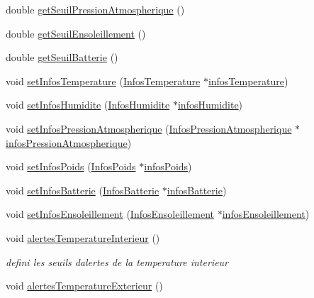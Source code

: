 \begin{DoxyCompactItemize}
\item 
double \hyperlink{class_alertes_a502fa36037246fb6eaad1db859bc1971}{get\+Seuil\+Pression\+Atmospherique} ()
\item 
double \hyperlink{class_alertes_a54900058557979664d25137399ae2512}{get\+Seuil\+Ensoleillement} ()
\item 
double \hyperlink{class_alertes_adcf9f9fb707944ae17f2355819eb58d1}{get\+Seuil\+Batterie} ()
\item 
void \hyperlink{class_alertes_a091a0fabca5b06302bc19de31aecafff}{set\+Infos\+Temperature} (\hyperlink{class_infos_temperature}{Infos\+Temperature} $\ast$\hyperlink{class_alertes_ad02b203545812ad6408befecc94ee0ec}{infos\+Temperature})
\item 
void \hyperlink{class_alertes_a05734ac9e97a9001de4ce9ef96235c87}{set\+Infos\+Humidite} (\hyperlink{class_infos_humidite}{Infos\+Humidite} $\ast$\hyperlink{class_alertes_a7b6d798ca0629b474120cd55eb8b510c}{infos\+Humidite})
\item 
void \hyperlink{class_alertes_a771133f26d4ab8c90d1bdf50e1d23d87}{set\+Infos\+Pression\+Atmospherique} (\hyperlink{class_infos_pression_atmospherique}{Infos\+Pression\+Atmospherique} $\ast$\hyperlink{class_alertes_af4bfb245d72bc2eb080df844aa50ac86}{infos\+Pression\+Atmospherique})
\item 
void \hyperlink{class_alertes_a100bad47769994abc976419a355c4a26}{set\+Infos\+Poids} (\hyperlink{class_infos_poids}{Infos\+Poids} $\ast$\hyperlink{class_alertes_add699ea1cebadb371f86b4c47ebe381d}{infos\+Poids})
\item 
void \hyperlink{class_alertes_a8bbe30ddc4893f943781749917b23463}{set\+Infos\+Batterie} (\hyperlink{class_infos_batterie}{Infos\+Batterie} $\ast$\hyperlink{class_alertes_ad5c756a52ff4d6ae85cc0f03bd80582b}{infos\+Batterie})
\item 
void \hyperlink{class_alertes_a5379fc65522a77dc2cc110e489e1469d}{set\+Infos\+Ensoleillement} (\hyperlink{class_infos_ensoleillement}{Infos\+Ensoleillement} $\ast$\hyperlink{class_alertes_abd9b6ff4e9f1df3c360374cceb8d0601}{infos\+Ensoleillement})
\item 
void \hyperlink{class_alertes_a8bc56cf9eb525624b2c1f5b20f86724b}{alertes\+Temperature\+Interieur} ()
\begin{DoxyCompactList}\small\item\em defini les seuils d\textquotesingle{}alertes de la temperature interieur \end{DoxyCompactList}\item 
void \hyperlink{class_alertes_a91fb2665fa8b6c32c74bfe4d1b89a2d8}{alertes\+Temperature\+Exterieur} ()

\end{DoxyCompactItemize}
